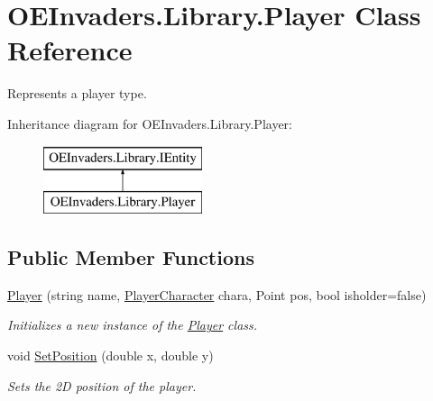 \hypertarget{class_o_e_invaders_1_1_library_1_1_player}{}\section{O\+E\+Invaders.\+Library.\+Player Class Reference}
\label{class_o_e_invaders_1_1_library_1_1_player}


Represents a player type.  


Inheritance diagram for O\+E\+Invaders.\+Library.\+Player\+:\begin{figure}[H]
\begin{center}
\leavevmode
\includegraphics[height=2.000000cm]{class_o_e_invaders_1_1_library_1_1_player}
\end{center}
\end{figure}
\subsection*{Public Member Functions}
\begin{DoxyCompactItemize}
\item 
\mbox{\hyperlink{class_o_e_invaders_1_1_library_1_1_player_abf828a4deec8282e11c19a9e73b1877d}{Player}} (string name, \mbox{\hyperlink{namespace_o_e_invaders_1_1_library_ad161194088b9101570c071d1baa1d2c7}{Player\+Character}} chara, Point pos, bool isholder=false)
\begin{DoxyCompactList}\small\item\em Initializes a new instance of the \mbox{\hyperlink{class_o_e_invaders_1_1_library_1_1_player}{Player}} class. \end{DoxyCompactList}\item 
void \mbox{\hyperlink{class_o_e_invaders_1_1_library_1_1_player_a7dd8d15ddfdb152c2e0c3764a9b35bbc}{Set\+Position}} (double x, double y)
\begin{DoxyCompactList}\small\item\em Sets the 2D position of the player. \end{DoxyCompactList}\end{DoxyCompactItemize}
